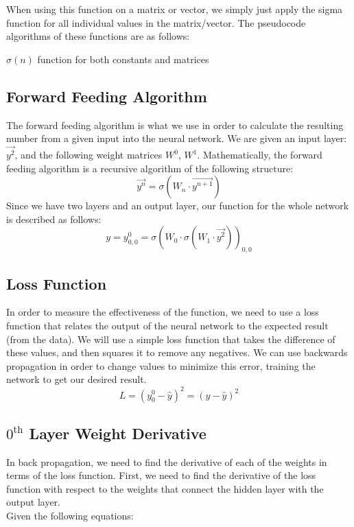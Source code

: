 \documentclass[10pt]{article}
\begin{document}
When using this function on a matrix or vector, we simply just apply the sigma function for all individual values in the matrix/vector. The pseudocode algorithms of these functions are as follows:

\begin{algorithm}[H]
    \caption{$\sigma(n)$ function for both constants and matrices}
\end{algorithm}

\subsection{Forward Feeding Algorithm}
The forward feeding algorithm is what we use in order to calculate the resulting number from a given input into the neural network. We are given an input layer: $\vec{y^2}$, and the following weight matrices $W^0$, $W^1$. Mathematically, the forward feeding algorithm is a recursive algorithm of the following structure:
$$\vec{y^n} = \sigma(W_{n} \cdot \vec{y^{n+1}})$$
Since we have two layers and an output layer, our function for the whole network is described as follows:
$$y = y^0_{0,0} = \sigma(W_0 \cdot \sigma(W_1 \cdot \vec{y^2}))_{0,0}$$
\subsection{Loss Function}
In order to measure the effectiveness of the function, we need to use a loss function that relates the output of the neural network to the expected result (from the data). We will use a simple loss function that takes the difference of these values, and then squares it to remove any negatives. We can use backwards propagation in order to change values to minimize this error, training the network to get our desired result.
$$L = (y^0_0 - \hat{y})^2 = (y - \hat{y})^2$$

\subsection{$0^{\text{th}}$ Layer Weight Derivative}
In back propagation, we need to find the derivative of each of the weights in terms of the loss function. First, we need to find the derivative of the loss function with respect to the weights that connect the hidden layer with the output layer.\\
Given the following equations:
\end{document}
